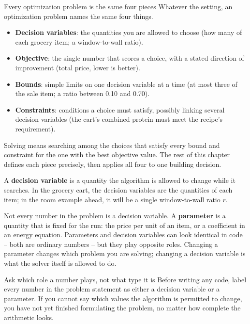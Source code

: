 \begin{ExplainBox}{Every optimization problem is the same four pieces}
Whatever the setting, an optimization problem names the same four things.
\begin{itemize}
    \item \textbf{Decision variables}: the quantities you are allowed to choose
          (how many of each grocery item; a window-to-wall ratio).
    \item \textbf{Objective}: the single number that scores a choice, with a
          stated direction of improvement (total price, lower is better).
    \item \textbf{Bounds}: simple limits on one decision variable at a time
          (at most three of the sale item; a ratio between 0.10 and 0.70).
    \item \textbf{Constraints}: conditions a choice must satisfy, possibly
          linking several decision variables (the cart's combined protein must
          meet the recipe's requirement).
\end{itemize}
Solving means searching among the choices that satisfy every bound and
constraint for the one with the best objective value. The rest of this chapter
defines each piece precisely, then applies all four to one building decision.
\end{ExplainBox}


A \textbf{decision variable} is a quantity the algorithm is allowed to change
while it searches. In the grocery cart, the decision variables are the
quantities of each item; in the room example ahead, it will be a single
window-to-wall ratio $r$.

Not every number in the problem is a decision variable. A \textbf{parameter} is
a quantity that is fixed for the run: the price per unit of an item, or a
coefficient in an energy equation. Parameters and decision variables can look
identical in code -- both are ordinary numbers -- but they play opposite roles.
Changing a parameter changes which problem you are solving; changing a
decision variable is what the solver itself is allowed to do.

\begin{SyntaxBox}{Ask which role a number plays, not what type it is}
Before writing any code, label every number in the problem statement as either
a decision variable or a parameter. If you cannot say which values the
algorithm is permitted to change, you have not yet finished formulating the
problem, no matter how complete the arithmetic looks.
\end{SyntaxBox}

